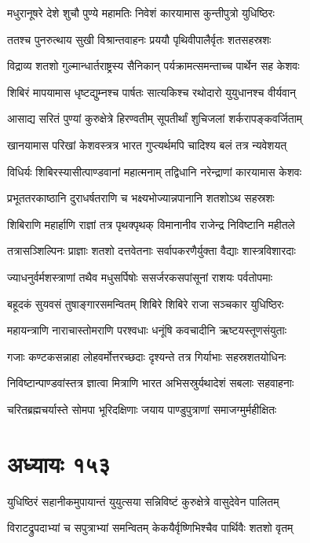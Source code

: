 \twolineshloka
{मधुरानूषरे देशे शुचौ पुण्ये महामतिः}
{निवेशं कारयामास कुन्तीपुत्रो युधिष्ठिरः}


\twolineshloka
{ततश्च पुनरुत्थाय सुखी विश्रान्तवाहनः}
{प्रययौ पृथिवीपालैर्वृतः शतसहस्रशः}


\twolineshloka
{विद्राव्य शतशो गुल्मान्धार्तराष्ट्रस्य सैनिकान्}
{पर्यक्रामत्समन्ताच्च पार्थेन सह केशवः}


\twolineshloka
{शिबिरं मापयामास धृष्टद्युम्नश्च पार्षतः}
{सात्यकिश्च रथोदारो युयुधानश्च वीर्यवान्}


\twolineshloka
{आसाद्य सरितं पुण्यां कुरुक्षेत्रे हिरण्वतीम्}
{सूपतीर्थां शुचिजलां शर्करापङ्कवर्जिताम्}


\twolineshloka
{खानयामास परिखां केशवस्त्रत्र भारत}
{गुप्त्यर्थमपि चादिश्य बलं तत्र न्यवेशयत्}


\twolineshloka
{विधिर्यः शिबिरस्यासीत्पाण्डवानां महात्मनाम्}
{तद्विधानि नरेन्द्राणां कारयामास केशवः}


\twolineshloka
{प्रभूततरकाष्ठानि दुराधर्षतराणि च}
{भक्ष्यभोज्यान्नपानानि शतशोऽथ सहस्रशः}


\twolineshloka
{शिबिराणि महार्हाणि राज्ञां तत्र पृथक्पृथक्}
{विमानानीव राजेन्द्र निविष्टानि महीतले}


\twolineshloka
{तत्रासञ्शिल्पिनः प्राज्ञाः शतशो दत्तवेतनाः}
{सर्वापकरणैर्युक्ता वैद्याः शास्त्रविशारदाः}


\twolineshloka
{ज्याधनुर्वर्मशस्त्राणां तथैव मधुसर्पिषोः}
{ससर्जरकसपांसूनां राशयः पर्वतोपमाः}


\twolineshloka
{बहूदकं सुयवसं तुषाङ्गारसमन्वितम्}
{शिबिरे शिबिरे राजा सञ्चकार युधिष्ठिरः}


\twolineshloka
{महायन्त्राणि नाराचास्तोमराणि परश्वधाः}
{धनूंषि कवचादीनि ऋष्टयस्तूणसंयुताः}


\twolineshloka
{गजाः कण्टकसन्नाहा लोहवर्मोत्तरच्छदाः}
{दृश्यन्ते तत्र गिर्याभाः सहस्रशतयोधिनः}


\twolineshloka
{निविष्टान्पाण्डवांस्तत्र ज्ञात्वा मित्राणि भारत}
{अभिसस्रुर्यथादेशं सबलाः सहवाहनाः}


\twolineshloka
{चरितब्रह्मचर्यास्ते सोमपा भूरिदक्षिणाः}
{जयाय पाण्डुपुत्राणां समाजग्मुर्महीक्षितः}


\chapter{अध्यायः १५३}
\twolineshloka
{युधिष्ठिरं सहानीकमुपायान्तं युयुत्सया}
{सन्निविष्टं कुरुक्षेत्रे वासुदेवेन पालितम्}


\twolineshloka
{विराटद्रुपदाभ्यां च सपुत्राभ्यां समन्वितम्}
{केकयैर्वृष्णिभिश्चैव पार्थिवैः शतशो वृतम्}


